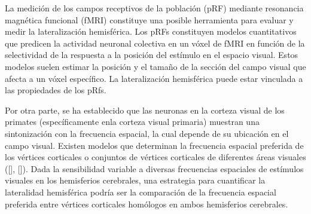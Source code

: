 

La medición de los campos receptivos de la población (pRF)  mediante resonancia magnética funcional (fMRI) constituye una posible herramienta para evaluar y medir la lateralización hemisférica. Los pRFs constituyen modelos cuantitativos que predicen la actividad neuronal colectiva en un vóxel de fMRI en función de la selectividad de la respuesta a la posición del estímulo en el espacio visual. Estos modelos suelen estimar la posición y el tamaño de la sección del campo visual que afecta a un vóxel específico. La lateralización hemisférica puede estar vinculada a las propiedades de los pRfs.

Por otra parte, se ha establecido que las neuronas en la corteza visual de los primates (específicamente enla corteza visual primaria) muestran una sintonización con la frecuencia espacial, la cual depende de su ubicación en el campo visual. Existen modelos que determinan la frecuencia espacial preferida de los v\'ertices corticales o conjuntos de v\'ertices corticales de diferentes áreas visuales ([\cite{aghajari_population_2020}], [\cite{broderick_mapping_2022}]). Dada la sensibilidad variable a diversas frecuencias espaciales de estímulos visuales en los hemisferios cerebrales, una estrategia para cuantificar la lateralidad hemisférica podría ser la comparación de la frecuencia espacial preferida entre v\'ertices corticales homólogos en ambos hemisferios cerebrales.

